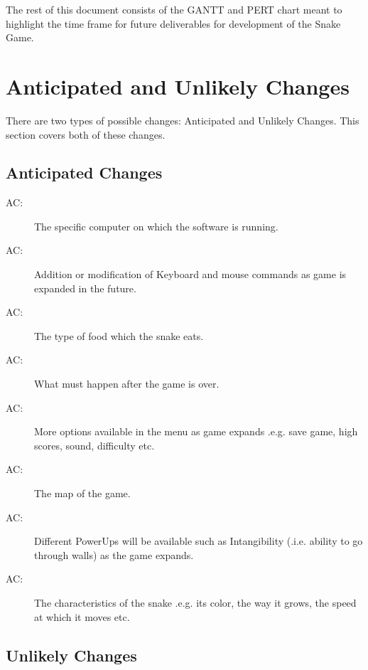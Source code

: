 \documentclass[12pt]{article}
\newcounter{acnum}
\newcommand{\actheacnum}{AC\theacnum}
\begin{document}
The rest of this document consists of the GANTT and PERT chart meant to highlight the time frame for future deliverables for development of the Snake Game.

\section{Anticipated and Unlikely Changes} \label{SecChange}

There are two types of possible changes: Anticipated and Unlikely Changes. This section covers both of these changes.

\subsection{Anticipated Changes} \label{SecAchange}



\begin{description}
\item[ \actheacnum \label{acHardware}:] The specific computer on which the software is running.
\item[ \actheacnum \label{acInput}:] Addition or modification of Keyboard and mouse commands as game is expanded in the future.
\item[ \actheacnum \label{acParams}:] The type of food which the snake eats.
\item[ \actheacnum \label{acOutput}:] What must happen after the game is over.
\item[ \actheacnum \label{acODEs}:] More options available in the menu as game expands .e.g. save game, high scores, sound, difficulty etc.
\item[ \actheacnum \label{acEnergy}:] The map of the game.
\item[ \actheacnum \label{acControl}:] Different PowerUps will be available such as Intangibility (.i.e. ability to go through walls) as the game expands.
\item[ \actheacnum \label{acSeqDS}:] The characteristics of the snake .e.g. its color, the way it grows, the speed at which it moves etc.
\end{description}

\subsection{Unlikely Changes} \label{SecUchange}
\end{document}

